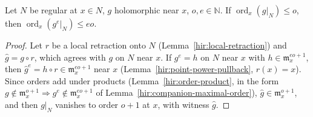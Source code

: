 \begin{lemma}
\label{mc:order-power-strict}
\leanok
Let \(N\) be regular at \(x\in N\), \(g\) holomorphic near \(x\), \(o,e\in\mathbb N\). If \(\operatorname{ord}_x(g|_N)\le o\), then
\(\operatorname{ord}_x(g^e|_N)\le eo\).
\end{lemma}
\begin{proof}
\leanok
Let \(r\) be a local retraction onto \(N\) (Lemma~\ref{hir:local-retraction}) and \(\hat g=g\circ r\), which agrees with \(g\) on \(N\) near \(x\). If \(g^e=h\) on \(N\) near
\(x\) with \(h\in\mathfrak m_x^{eo+1}\), then \(\hat g^e=h\circ r\in\mathfrak m_x^{eo+1}\) near \(x\) (Lemma~\ref{hir:point-power-pullback}, \(r(x)=x\)). Since orders add under
products (Lemma~\ref{hir:order-product}, in the form \(g\notin\mathfrak m_x^{o+1}\Rightarrow g^e\notin\mathfrak m_x^{eo+1}\) of Lemma~\ref{hir:companion-maximal-order}),
\(\hat g\in\mathfrak m_x^{o+1}\), and then \(g|_N\) vanishes to order \(o+1\) at \(x\), with witness \(\hat g\).
\end{proof}

